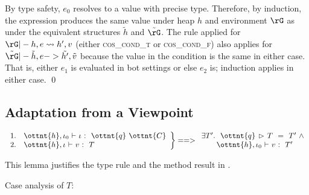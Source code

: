 
By type safety, $e_0$ resolves to a value with precise type. Therefore, by
induction, the expression produces the same value under heap $h$ and
environment $\rG$ as under the equivalent structures $\tilde{h}$ and
$\tilde{\rG}$. The rule applied for $\rG |- h, e \leadsto h', v$
(either \textsc{cos\_cond\_t} or \textsc{cos\_cond\_f})
also applies for 
$\tilde{\rG} |- \tilde{h}, e -> \tilde{h'}, \tilde{v}$ because the value in the
condition is the same in either case. That is, either $e_1$ is evaluated in bot
settings or else $e_2$ is; induction applies in either case.
\qed


\subsection{Adaptation from a Viewpoint}

\begin{lemma}
\label{enerj:lemma:comp}
\[
\left.
\begin{array}{ll}
1. &  \ottnt{h} ,  \iota_{{\mathrm{0}}} \  \textsf{$\vdash$} \  \iota \  \textsf{:} \ \    \ottnt{q} \  \ottnt{C}   \\
2. &  \ottnt{h} ,  \iota \  \textsf{$\vdash$} \  v \  \textsf{:} \ \  T \\
\end{array}
\right\} ==>
\begin{array}{l}
\exists T'.\ \ 
 \ottnt{q} \, \rhd\,  T \ \  \textsf{=} \ \  T' \ \wedge \\
\qquad
 \ottnt{h} ,  \iota_{{\mathrm{0}}} \  \textsf{$\vdash$} \  v \  \textsf{:} \ \  T' 
\end{array}
\]
\end{lemma}

\noindent
This lemma justifies the type rule  and the
method result in \ottdrulename{tr\_call}.

Case analysis of $T$:


